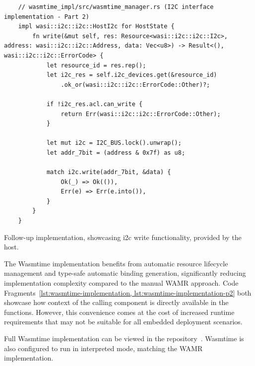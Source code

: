 \begin{listing}[H]
    \begin{verbatim}
    // wasmtime_impl/src/wasmtime_manager.rs (I2C interface implementation - Part 2)
    impl wasi::i2c::i2c::HostI2c for HostState {
        fn write(&mut self, res: Resource<wasi::i2c::i2c::I2c>, address: wasi::i2c::i2c::Address, data: Vec<u8>) -> Result<(), wasi::i2c::i2c::ErrorCode> {
            let resource_id = res.rep();
            let i2c_res = self.i2c_devices.get(&resource_id)
                .ok_or(wasi::i2c::i2c::ErrorCode::Other)?;
    
            if !i2c_res.acl.can_write {
                return Err(wasi::i2c::i2c::ErrorCode::Other);
            }
    
            let mut i2c = I2C_BUS.lock().unwrap();
            let addr_7bit = (address & 0x7f) as u8;
    
            match i2c.write(addr_7bit, &data) {
                Ok(_) => Ok(()),
                Err(e) => Err(e.into()),
            }
        }
    }
    \end{verbatim}
    \caption{Follow-up implementation, showcasing \acrshort{i2c} write functionality, provided by the host.}
    \label{lst:wasmtime-implementation-p2}
\end{listing}

The Wasmtime implementation benefits from automatic resource lifecycle management and type-safe automatic binding generation, significantly reducing implementation complexity compared to the manual WAMR approach. Code Fragments~\ref{lst:wasmtime-implementation, lst:wasmtime-implementation-p2} both showcase how context of the calling component is directly available in the functions. However, this convenience comes at the cost of increased runtime requirements that may not be suitable for all embedded deployment scenarios.

Full Wasmtime implementation can be viewed in the repository~\cite{wamr-wasi-i2c}. Wasmtime is also configured to run in interpreted mode, matching the WAMR implementation.